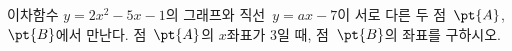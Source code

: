 이차함수 $y=2x^2-5x-1$의 그래프와 직선~$y=ax-7$이 서로 다른 두 점~$\pt{A}$, $\pt{B}$에서 만난다. 점~$\pt{A}$의 $x$좌표가 $3$일 때, 점~$\pt{B}$의 좌표를 구하시오. 
